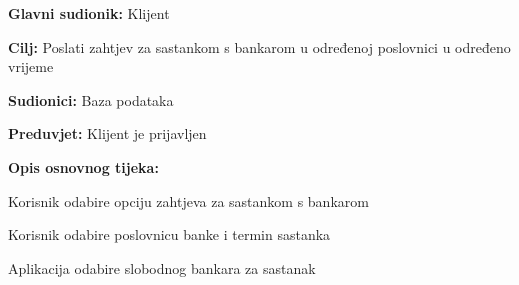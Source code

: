     		
    			
    			\noindent {}
    			\begin{packed_item}
    				
    				\item \textbf{Glavni sudionik: }Klijent
    				\item  \textbf{Cilj:} Poslati zahtjev za sastankom s bankarom u određenoj poslovnici u određeno vrijeme
    				\item  \textbf{Sudionici:} Baza podataka
    				\item  \textbf{Preduvjet:} Klijent je prijavljen
    				\item  \textbf{Opis osnovnog tijeka:}
    				
    				\item[] \begin{packed_enum}
    					
    					\item Korisnik odabire opciju zahtjeva za sastankom s bankarom
    					\item Korisnik odabire poslovnicu banke i termin sastanka
    					\item Aplikacija odabire slobodnog bankara za sastanak 
    					
    					
    					
    					
    				\end{packed_enum}
    				
    				
    			\end{packed_item}
    		
